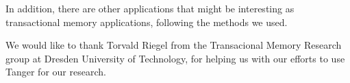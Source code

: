 \documentclass[preprint,11pt]{sigplanconf}
\begin{document}
In addition, there are other applications that might be interesting as
transactional memory applications, following the methods we used.



\acks

We would like to thank Torvald Riegel from the Transacional Memory Research
group at Dresden University of Technology, for helping us with our efforts to
use {\sc Tanger} for our research.



%
%


\end{document}

